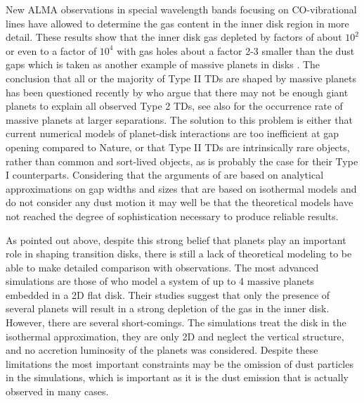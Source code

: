 \documentclass[10pt,fleqn,twoside]{article}
\begin{document}
New ALMA observations in special wavelength bands focusing on CO-vibrational lines have allowed
to determine the gas content in the inner disk region in more detail. These results show that 
the inner disk gas depleted by factors of about $10^{2}$ \citep{2015A&A...579A.106V} or even to a factor
of $10^{4}$ with gas holes about a factor 2-3 smaller than the dust gaps \citep{2016A&A...585A..58V}
which is taken as another example of massive planets in disks \citep{2016Natur.530..169H}.
The conclusion that all or the majority of Type II TDs are shaped by massive planets has been
questioned recently by \citet{2016ApJ...825...77D} who argue that
there may not be enough giant planets to explain all observed Type 2 TDs, see also \citet{2008PASP..120..531C}
for the occurrence rate of massive planets at larger separations.
The solution to this problem is either that current numerical 
models of planet-disk interactions are too inefficient at gap opening compared to Nature, 
or that Type II TDs are intrinsically rare objects, rather than common and sort-lived objects, 
as is probably the case for their Type I counterparts. Considering that the arguments
of \citet{2016ApJ...825...77D} are based on analytical approximations on gap widths and sizes that
are based on isothermal models and do not consider any dust motion it may well be that the theoretical models
have not reached the degree of sophistication necessary to produce reliable results.

As pointed out above,  
despite this strong belief that planets play an important role in shaping transition disks, there
is still a lack of theoretical modeling to be able to make detailed comparison with observations.
The most advanced simulations are those of \citet{2011ApJ...729...47Z} who model a system of up to 4 massive planets embedded
in a 2D flat disk. Their studies suggest that only the presence of several planets will result in a
strong depletion of the gas in the inner disk. However, there are several short-comings. The simulations treat the disk in the
isothermal approximation, they are only 2D and neglect the vertical structure, and no accretion luminosity of the
planets was considered. Despite these limitations the most important constraints may be the omission of
dust particles in the simulations, which is important as it is the dust emission that is actually observed
in many cases.
\end{document}
